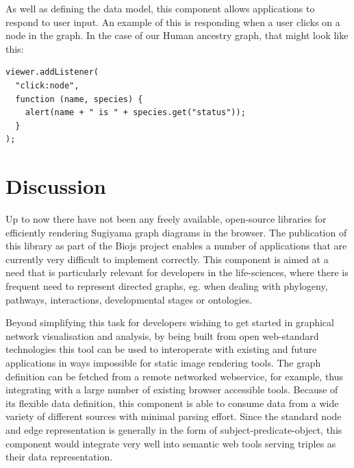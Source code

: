 \documentclass[10pt,a4paper,twocolumn]{article}
\begin{document}
As well as defining the data model, this component allows applications to respond to
user input. An example of this is responding when a user clicks on a node in the graph. In the
case of our Human ancestry graph, that might look like this:

\begin{lstlisting}[caption={Listening for Events}, label={code:add-listener}]
viewer.addListener(
  "click:node",
  function (name, species) {
    alert(name + " is " + species.get("status"));
  }
);
\end{lstlisting}

\section*{Discussion}

Up to now there have not been any freely available, open-source libraries for efficiently
rendering Sugiyama graph diagrams in the browser. The publication of this library as part of the
Biojs project enables a number of applications that are currently very difficult to implement
correctly. This component is aimed at a need that is particularly relevant for developers in
the life-sciences, where there is frequent need to represent directed graphs, eg.
when dealing with phylogeny, pathways, interactions, developmental stages or ontologies.

Beyond simplifying this task for developers wishing to get started in graphical
network visualisation and analysis, by being built from open web-standard technologies this tool
can be used to interoperate with existing and future applications in ways impossible for static
image rendering tools. The graph definition can be fetched from a remote networked webservice, for
example, thus integrating with a large number of existing browser accessible tools. Because of its
flexible data definition, this component is able to consume data from a wide variety of different
sources with minimal parsing effort. Since the standard node and edge representation is generally
in the form of subject-predicate-object, this component would integrate very well into semantic
web tools serving triples as their data representation.
\end{document}
